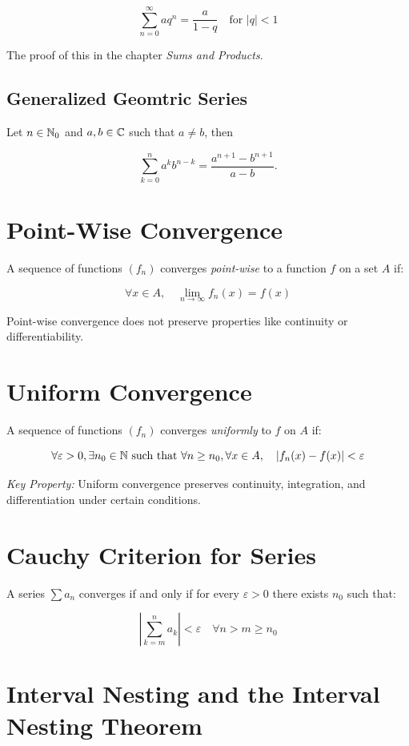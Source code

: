 \[
	\sum_{n = 0}^{\infty} aq^n = \frac{a}{1 - q} \quad \text{for } |q| < 1
\]

The proof of this in the chapter \emph{Sums and Products}.

\subsection{Generalized Geomtric Series}

Let \(n \in \mathbb{N}_0\) and \(a, b \in \mathbb{C}\) such that \(a \neq b\), then

\[
	\sum_{k = 0}^{n} a^kb^{n - k} = \frac{a^{n + 1} - b^{n + 1}}{a - b}.
\]

\section{Point-Wise Convergence}

A sequence of functions \((f_n)\) converges \emph{point-wise} to a function \(f\) on a set \(A\) if:

\[
	\forall x \in A, \quad \lim_{n \to \infty} f_n(x) = f(x)
\]

Point-wise convergence does not preserve properties like continuity or differentiability.

\section{Uniform Convergence}

A sequence of functions \((f_n)\) converges \emph{uniformly} to \(f\) on \(A\) if:

\[
	\forall \varepsilon > 0, \exists n_0 \in \mathbb{N} \text{ such that } \forall n \ge n_0, \forall x \in A, \quad |f_n(x) - f(x)| < \varepsilon
\]

\emph{Key Property:} Uniform convergence preserves continuity, integration, and differentiation under
certain conditions.

\section{Cauchy Criterion for Series}

A series \(\sum a_n\) converges if and only if for every \(\varepsilon > 0\) there exists \(n_0\)
such that:

\[
	\left| \sum_{k = m}^{n} a_k \right| < \varepsilon \quad \forall n > m \ge n_0
\]

\section{Interval Nesting and the Interval Nesting Theorem}

